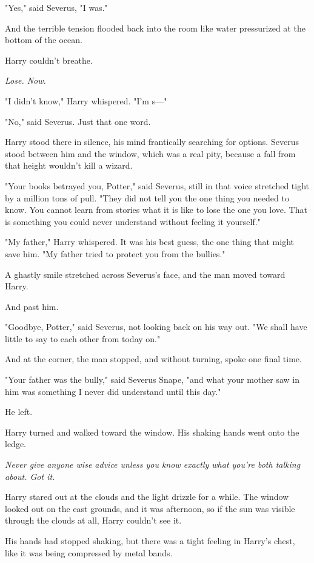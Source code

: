 "Yes," said Severus, "I was."

And the terrible tension flooded back into the room like water pressurized at
the bottom of the ocean.

Harry couldn't breathe.

\emph{Lose. Now.}

"I didn't know," Harry whispered. "I'm s\mbox{---}"

"No," said Severus. Just that one word.

Harry stood there in silence, his mind frantically searching for options.
Severus stood between him and the window, which was a real pity, because a fall
from that height wouldn't kill a wizard.

"Your books betrayed you, Potter," said Severus, still in that voice stretched
tight by a million tons of pull. "They did not tell you the one thing you
needed to know. You cannot learn from stories what it is like to lose the one
you love. That is something you could never understand without feeling it
yourself."

"My father," Harry whispered. It was his best guess, the one thing that might
save him. "My father tried to protect you from the bullies."

A ghastly smile stretched across Severus's face, and the man moved toward Harry.

And past him.

"Goodbye, Potter," said Severus, not looking back on his way out. "We shall
have little to say to each other from today on."

And at the corner, the man stopped, and without turning, spoke one final time.

"Your father was the bully," said Severus Snape, "and what your mother saw in
him was something I never did understand until this day."

He left.

Harry turned and walked toward the window. His shaking hands went onto the
ledge.

\emph{Never give anyone wise advice unless you know exactly what you're both
talking about. Got it.}

Harry stared out at the clouds and the light drizzle for a while. The window
looked out on the east grounds, and it was afternoon, so if the sun was visible
through the clouds at all, Harry couldn't see it.

His hands had stopped shaking, but there was a tight feeling in Harry's chest,
like it was being compressed by metal bands.

